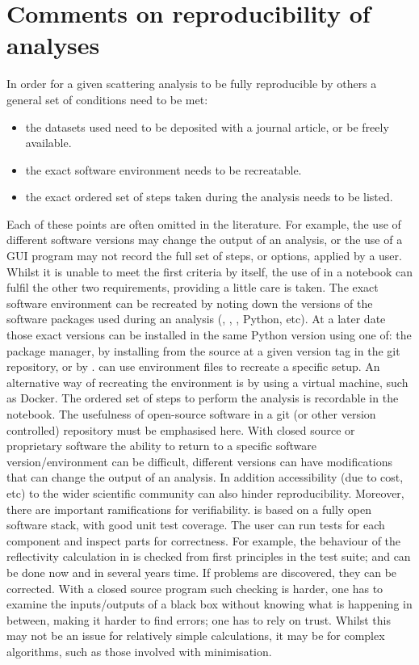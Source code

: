 \documentclass[12pt]{article}
\begin{document}
\section*{Comments on reproducibility of analyses}
In order for a given scattering analysis to be fully reproducible by others a general set of conditions need to be met:
\begin{itemize}
  \item the datasets used need to be deposited with a journal article, or be freely available.
  \item the exact software environment needs to be recreatable.
  \item the exact ordered set of steps taken during the analysis needs to be listed.
\end{itemize} 
Each of these points are often omitted in the literature. For example, the use of different software versions may change the output of an analysis, or the use of a GUI program may not record the full set of steps, or options, applied by a user.
Whilst it is unable to meet the first criteria by itself, the use of  in a \Jupyter notebook can fulfil the other two requirements, providing a little care is taken. The exact software environment can be recreated by noting down the versions of the software packages used during an analysis (, \SciPy, \NumPy, Python, etc). At a later date those exact versions can be installed in the same Python version using one of: the \conda package manager, by installing from the source at a given version tag in the git repository, or by \pip. \conda can use environment files to recreate a specific setup. An alternative way of recreating the environment is by using a virtual machine, such as Docker. The ordered set of steps to perform the analysis is recordable in the \Jupyter notebook.
The usefulness of open-source software in a git (or other version controlled) repository must be emphasised here. With closed source or proprietary software the ability to return to a specific software version/environment can be difficult, different versions can have modifications that can change the output of an analysis. In addition accessibility (due to cost, etc) to the wider scientific community can also hinder reproducibility.
Moreover, there are important ramifications for verifiability.  is based on a fully open software stack, with good unit test coverage. The user can run tests for each component and inspect parts for correctness. For example, the behaviour of the reflectivity calculation in  is checked from first principles in the test suite; and can be done now and in several years time. If problems are discovered, they can be corrected. With a closed source program such checking is harder, one has to examine the inputs/outputs of a black box without knowing what is happening in between, making it harder to find errors; one has to rely on trust. Whilst this may not be an issue for relatively simple calculations, it may be for complex algorithms, such as those involved with minimisation.
\end{document}
